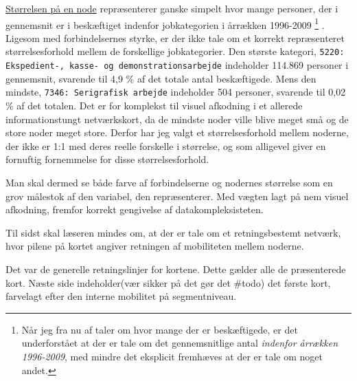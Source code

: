 \underline{Størrelsen på en node} repræsenterer ganske simpelt hvor mange personer, der i gennemsnit er i beskæftiget indenfor jobkategorien i årrækken 1996-2009%
%
\footnote{Når jeg fra nu af taler om hvor mange der er beskæftigede, er det underforstået at der er tale om det gennemsnitlige antal \emph{indenfor årrækken 1996-2009}, med mindre det eksplicit fremhæves at der er tale om noget andet.}%
%
. Ligesom med forbindelsernes styrke, er der ikke tale om et korrekt repræsenteret størrelsesforhold mellem de forskellige jobkategorier. Den største kategori, \texttt{5220: Ekspedient-, kasse- og demonstrationsarbejde} indeholder 114.869 personer i gennemsnit, svarende til 4,9 \% af det totale antal beskæftigede. Mens den mindste, \texttt{7346: Serigrafisk arbejde} indeholder 504 personer, svarende til 0,02 \% af det totalen. Det er for komplekst til visuel afkodning i et allerede informationstungt netværkskort, da de mindste noder ville blive meget små og de store noder meget store. Derfor har jeg valgt et størrelsesforhold mellem noderne, der ikke er 1:1 med deres reelle forskelle i størrelse, og som alligevel giver en fornuftig fornemmelse for disse størrelsesforhold.  

Man skal dermed se både farve af forbindelserne og nodernes størrelse som en grov målestok af den variabel, den repræsenterer. Med vægten lagt på nem visuel afkodning, fremfor korrekt gengivelse af datakompleksisteten.

Til sidst skal læseren mindes om, at der er tale om et retningsbestemt netværk, hvor pilene på kortet angiver retningen af mobiliteten mellem noderne. 

Det var de generelle retningslinjer for kortene. Dette gælder alle de præsenterede kort. Næste side indeholder(vær sikker på det gør det \#todo) det første kort, farvelagt efter den interne mobilitet på segmentniveau.


